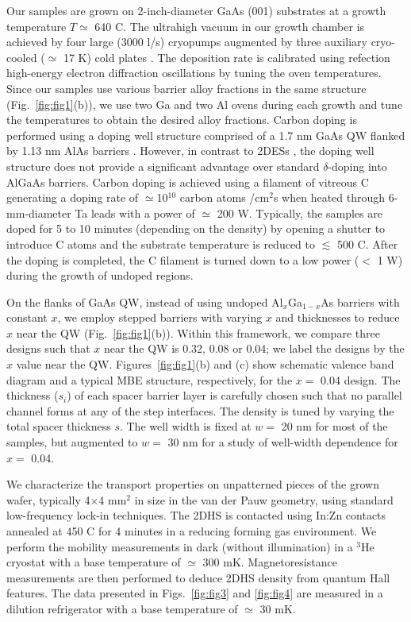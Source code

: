 \documentclass[reprint,amsmath,amssymb,aps,prl,nobibnotes,superscriptaddress]{revtex4-1}
\begin{document}
Our samples are grown on 2-inch-diameter GaAs (001) substrates at a growth temperature $T\simeq$ 640 \textdegree C. The ultrahigh vacuum in our growth chamber is achieved by four large (3000 l/s) cryopumps augmented by three auxiliary cryo-cooled ($\simeq$ 17 K) cold plates \cite{Chung2021elec}. The deposition rate is calibrated using refection high-energy electron diffraction oscillations by tuning the oven temperatures. Since our samples use various barrier alloy fractions in the same structure (Fig.~\ref{fig:fig1}(b)), we use two Ga and two Al ovens during each growth and tune the temperatures to obtain the desired alloy fractions. Carbon doping is performed using a doping well structure comprised of a 1.7 nm GaAs QW flanked by 1.13 nm AlAs barriers \cite{ChungDWS}. However, in contrast to 2DESs \cite{Chung2021elec}, the doping well structure does not provide a significant advantage over standard $\delta$-doping into AlGaAs barriers. Carbon doping is achieved using a filament of vitreous C generating a doping rate of $\simeq $10$^{10}$ carbon atoms  /cm$^{2}$s when heated through 6-mm-diameter Ta leads with a power of $\simeq$ 200 W. Typically, the samples are doped for 5 to 10 minutes (depending on the density) by opening a shutter to introduce C atoms and the substrate temperature is reduced to $\lesssim$ 500 \textdegree C. After the doping is completed, the C filament is turned down to a low power ($<$ 1 W) during the growth of undoped regions. 

 On the flanks of GaAs QW, instead of using undoped Al$_x$Ga$_{1-x}$As barriers with constant $x$, we employ stepped barriers with varying $x$ and thicknesses to reduce $x$ near the QW (Fig.~\ref{fig:fig1}(b)). Within this framework, we compare three designs such that $x$ near the QW is 0.32, 0.08 or 0.04; we label the designs by the $x$ value near the QW. Figures~\ref{fig:fig1}(b) and (c) show schematic valence band diagram and a typical MBE structure, respectively, for the $x=$ 0.04 design. The thickness ($s_i$) of each spacer barrier layer is carefully chosen such that no parallel channel forms at any of the step interfaces. The density is tuned by varying the total spacer thickness $s$. The well width is fixed at $w=$ 20 nm for most of the samples, but augmented to $w=$ 30 nm for a study of well-width dependence for $x=$ 0.04.

We characterize the transport properties on unpatterned pieces of the grown wafer, typically 4$\times$4 mm$^2$ in size in the van der Pauw geometry, using standard low-frequency lock-in techniques. The 2DHS is contacted using In:Zn contacts annealed at 450 \textdegree C for 4 minutes in a reducing forming gas  environment. We perform the mobility measurements in dark (without illumination) in a $^3$He cryostat with a base temperature of $\simeq$ 300 mK. Magnetoresistance measurements are then performed to deduce 2DHS density from quantum Hall features. The data presented in Figs.~\ref{fig:fig3} and \ref{fig:fig4} are measured in a dilution refrigerator with a base temperature of $\simeq$ 30 mK.
\end{document}
